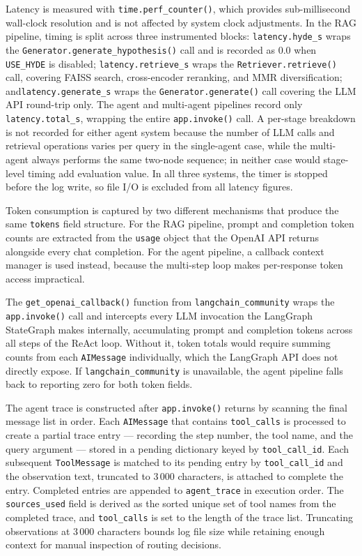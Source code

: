 Latency is measured with \texttt{time.perf\_counter()}, which provides sub-millisecond wall-clock resolution and is not affected by system clock adjustments. In the RAG pipeline, timing is split across three instrumented blocks: \texttt{latency.hyde\_s} wraps the \texttt{Generator.generate\_hypothesis()} call and is recorded as 0.0 when \texttt{USE\_HYDE} is disabled; \texttt{latency.retrieve\_s} wraps the \texttt{Retriever.retrieve()} call, covering FAISS search, cross-encoder reranking, and MMR diversification; and\linebreak[0] \texttt{latency.generate\_s} wraps the \texttt{Generator.generate()} call covering the LLM API round-trip only. The agent and multi-agent pipelines record only \texttt{latency.total\_s}, wrapping the entire \texttt{app.invoke()} call. A per-stage breakdown is not recorded for either agent system because the number of LLM calls and retrieval operations varies per query in the single-agent case, while the multi-agent always performs the same two-node sequence; in neither case would stage-level timing add evaluation value. In all three systems, the timer is stopped before the log write, so file I/O is excluded from all latency figures.

Token consumption is captured by two different mechanisms that produce the same \texttt{tokens} field structure. For the RAG pipeline, prompt and completion token counts are extracted from the \texttt{usage} object that the OpenAI API returns alongside every chat completion. For the agent pipeline, a callback context manager is used instead, because the multi-step loop makes per-response token access impractical.

The \texttt{get\_openai\_callback()} function from \texttt{langchain\_community} wraps the \texttt{app.invoke()} call and intercepts every LLM invocation the LangGraph StateGraph makes internally, accumulating prompt and completion tokens across all steps of the ReAct loop. Without it, token totals would require summing counts from each \texttt{AIMessage} individually, which the LangGraph API does not directly expose. If \texttt{langchain\_community} is unavailable, the agent pipeline falls back to reporting zero for both token fields.

The agent trace is constructed after \texttt{app.invoke()} returns by scanning the final message list in order. Each \texttt{AIMessage} that contains \texttt{tool\_calls} is processed to create a partial trace entry — recording the step number, the tool name, and the query argument — stored in a pending dictionary keyed by \texttt{tool\_call\_id}. Each subsequent \texttt{ToolMessage} is matched to its pending entry by \texttt{tool\_call\_id} and the observation text, truncated to 3\,000 characters, is attached to complete the entry. Completed entries are appended to \texttt{agent\_trace} in execution order. The \texttt{sources\_used} field is derived as the sorted unique set of tool names from the completed trace, and \texttt{tool\_calls} is set to the length of the trace list. Truncating observations at 3\,000 characters bounds log file size while retaining enough context for manual inspection of routing decisions.

